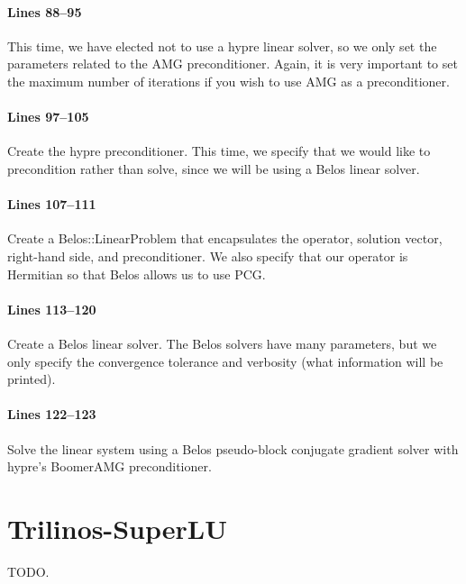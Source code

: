 \documentclass[pdf,12pt,report,strict]{SANDreport}
\begin{document}
\paragraph{Lines 88--95}
This time, we have elected not to use a hypre linear solver, so we only set the
parameters related to the AMG preconditioner.  Again, it is very important to
set the maximum number of iterations if you wish to use AMG as a preconditioner.

\paragraph{Lines 97--105}
Create the hypre preconditioner.  This time, we specify that we would like to
precondition rather than solve, since we will be using a Belos linear solver.

\paragraph{Lines 107--111}
Create a Belos::LinearProblem that encapsulates the operator, solution vector,
right-hand side, and preconditioner.  We also specify that our operator is
Hermitian so that Belos allows us to use PCG.

\paragraph{Lines 113--120}
Create a Belos linear solver.  The Belos solvers have many parameters, but we
only specify the convergence tolerance and verbosity (what information will be
printed).

\paragraph{Lines 122--123}
Solve the linear system using a Belos pseudo-block conjugate gradient solver
with hypre's BoomerAMG preconditioner.

\section{Trilinos-SuperLU}
{\color{red}TODO.}
\end{document}
